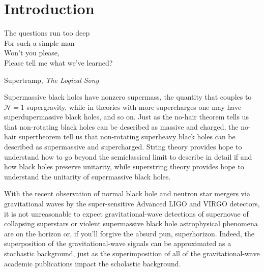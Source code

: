 \section{Introduction}

\epigraph{The questions run too deep\\
For such a simple man\\
Won't you please, \\
Please tell me what we've learned?}{Supertramp, \textit{The Logical Song}}

Supermassive black holes have nonzero supermass, the quantity that couples to $\mathcal{N}=1$ supergravity, while in theories with more supercharges one may have superdupermassive black holes, and so on.
Just as the no-hair theorem tells us that non-rotating black holes can be described as massive and charged, the no-hair supertheorem tell us that non-rotating superheavy black holes can be described as supermassive and supercharged.
String theory provides hope to understand how to go beyond the semiclassical limit to describe in detail if and how black holes preserve unitarity, while superstring theory provides hope to understand the unitarity of supermassive black holes.

With the recent observation of normal black hole \cite{Abbott:2016blz,Abbott:2016nmj,Abbott:2017vtc,Abbott:2017oio,Abbott:2017gyy} and neutron star\cite{TheLIGOScientific:2017qsa} mergers via gravitational waves by the super-sensitive Advanced LIGO and VIRGO detectors, it is not unreasonable to expect gravitational-wave detections of supernovae of collapsing superstars or violent supermassive black hole astrophysical phenomena are on the horizon or, if you'll forgive the absurd pun, superhorizon. 
Indeed, the superposition of the gravitational-wave signals can be approximated as a stochastic background, just as the superimposition of all of the gravitational-wave academic publications impact the scholastic background.

